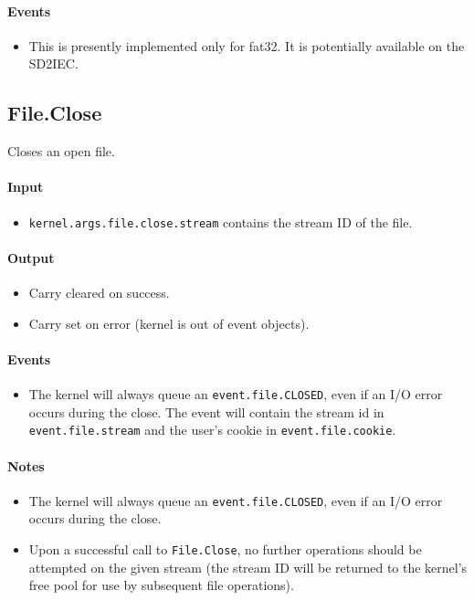 \paragraph{Events}
\begin{itemize}
\item This is presently implemented only for fat32.  It is potentially available on the SD2IEC.
\end{itemize}

\subsection*{File.Close}
Closes an open file.

\paragraph{Input}
\begin{itemize}
\item \verb+kernel.args.file.close.stream+ contains the stream ID of the file.
\end{itemize}

\paragraph{Output}
\begin{itemize}
\item Carry cleared on success.
\item Carry set on error (kernel is out of event objects).
\end{itemize}

\paragraph{Events}
\begin{itemize}
\item The kernel will always queue an \verb+event.file.CLOSED+, even if an I/O error occurs during the close.  The event will contain the stream id in \verb+event.file.stream+ and the user's cookie in \verb+event.file.cookie+.
\end{itemize}

\paragraph{Notes}
\begin{itemize}
\item The kernel will always queue an \verb+event.file.CLOSED+, even if an I/O error occurs during the close.
\item Upon a successful call to \verb+File.Close+, no further operations should be attempted on the given stream (the stream ID will be returned to the kernel's free pool for use by subsequent file operations).
\end{itemize}

